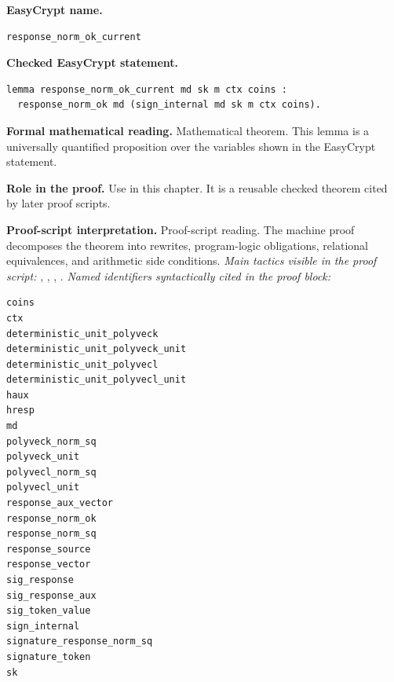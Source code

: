 \begin{formaltheorem}
\noindent\textbf{EasyCrypt name.}
\begin{lstlisting}[language=EasyCrypt,basicstyle=\ttfamily\scriptsize]
response_norm_ok_current
\end{lstlisting}
\noindent\textbf{Checked EasyCrypt statement.}
\begin{lstlisting}[language=EasyCrypt,basicstyle=\ttfamily\scriptsize]
lemma response_norm_ok_current md sk m ctx coins :
  response_norm_ok md (sign_internal md sk m ctx coins).
\end{lstlisting}
\noindent\textbf{Formal mathematical reading.}
Mathematical theorem. This lemma is a universally quantified proposition over the variables shown in the EasyCrypt statement.

\noindent\textbf{Role in the proof.}
Use in this chapter. It is a reusable checked theorem cited by later proof scripts.

\noindent\textbf{Proof-script interpretation.}
Proof-script reading. The machine proof decomposes the theorem into rewrites, program-logic obligations, relational equivalences, and arithmetic side conditions.
\emph{Main tactics visible in the proof script:} , , , .
\emph{Named identifiers syntactically cited in the proof block:}
\begin{lstlisting}[language=EasyCrypt,basicstyle=\ttfamily\scriptsize]
coins
ctx
deterministic_unit_polyveck
deterministic_unit_polyveck_unit
deterministic_unit_polyvecl
deterministic_unit_polyvecl_unit
haux
hresp
md
polyveck_norm_sq
polyveck_unit
polyvecl_norm_sq
polyvecl_unit
response_aux_vector
response_norm_ok
response_norm_sq
response_source
response_vector
sig_response
sig_response_aux
sig_token_value
sign_internal
signature_response_norm_sq
signature_token
sk
\end{lstlisting}

\end{formaltheorem}

